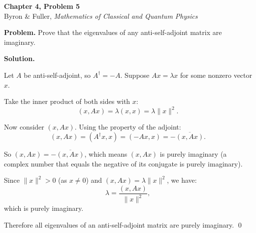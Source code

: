 \documentclass[12pt]{article}
\begin{document}
\begin{center}
{\Large\bfseries Chapter 4, Problem 5}\\[6pt]
Byron \& Fuller, \textit{Mathematics of Classical and Quantum Physics}
\end{center}

\bigskip

\textbf{Problem.} Prove that the eigenvalues of any anti-self-adjoint matrix are imaginary.

\bigskip
\textbf{Solution.}

Let $A$ be anti-self-adjoint, so $A^\dagger = -A$. Suppose $Ax = \lambda x$ for some nonzero vector $x$.

Take the inner product of both sides with $x$:
\[
(x, Ax) = \lambda (x, x) = \lambda \|x\|^2.
\]

Now consider $(x, Ax)$. Using the property of the adjoint:
\[
(x, Ax) = (A^\dagger x, x) = (-Ax, x) = -\overline{(x, Ax)}.
\]

So $(x, Ax) = -\overline{(x, Ax)}$, which means $(x, Ax)$ is purely imaginary (a complex number that equals the negative of its conjugate is purely imaginary).

Since $\|x\|^2 > 0$ (as $x \neq 0$) and $(x, Ax) = \lambda \|x\|^2$, we have:
\[
\lambda = \frac{(x, Ax)}{\|x\|^2},
\]
which is purely imaginary.

Therefore all eigenvalues of an anti-self-adjoint matrix are purely imaginary. \qed
\end{document}
